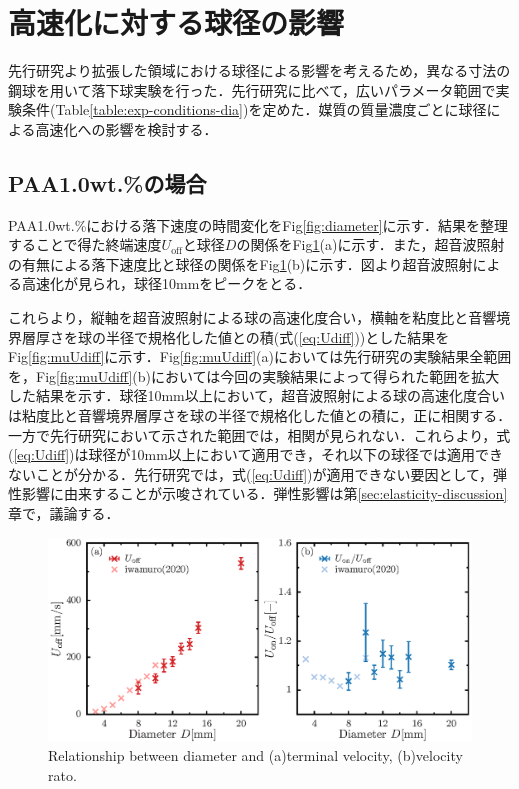 \section{高速化に対する球径の影響}
\label{sec:diameter}
先行研究より拡張した領域における球径による影響を考えるため，異なる寸法の鋼球を用いて落下球実験を行った．先行研究に比べて，広いパラメータ範囲で実験条件(Table\ref{table:exp-conditions-dia})を定めた．媒質の質量濃度ごとに球径による高速化への影響を検討する．

\subsection{PAA1.0wt.\%の場合}
PAA1.0wt.\%における落下速度の時間変化をFig\ref{fig:diameter}に示す．結果を整理することで得た終端速度$U_\text{off}$と球径$D$の関係をFig\ref{fig:diaUT}(a)に示す．また，超音波照射の有無による落下速度比と球径の関係をFig\ref{fig:diaUT}(b)に示す．図より超音波照射による高速化が見られ，球径10mmをピークをとる．

これらより，縦軸を超音波照射による球の高速化度合い，横軸を粘度比と音響境界層厚さを球の半径で規格化した値との積(式(\ref{eq:Udiff}))とした結果をFig\ref{fig:muUdiff}に示す．Fig\ref{fig:muUdiff}(a)においては先行研究\cite{ref:8}の実験結果全範囲を，Fig\ref{fig:muUdiff}(b)においては今回の実験結果によって得られた範囲を拡大した結果を示す．球径10mm以上において，超音波照射による球の高速化度合いは粘度比と音響境界層厚さを球の半径で規格化した値との積に，正に相関する．一方で先行研究\cite{ref:8}において示された範囲では，相関が見られない．これらより，式(\ref{eq:Udiff})は球径が10mm以上において適用でき，それ以下の球径では適用できないことが分かる．先行研究\cite{ref:8}では，式(\ref{eq:Udiff})が適用できない要因として，弾性影響に由来することが示唆されている．弾性影響は第\ref{sec:elasticity-discussion}章で，議論する．

\begin{figure}[ht]
    \centering
    \includegraphics[width=1\textwidth]{./5-Results/diaUT_Udiff.eps}
    \caption{Relationship between diameter and (a)terminal velocity, (b)velocity rato.}
    \label{fig:diaUT}
\end{figure}

